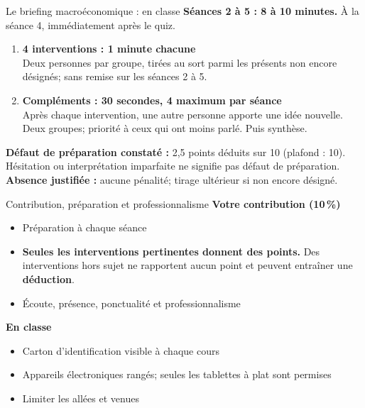 \documentclass[aspectratio=169]{beamer}
\begin{document}
\begin{frame}[t]{Le briefing macroéconomique : en classe}
   \small
   \textbf{Séances 2 à 5 : 8 à 10 minutes.} À la séance 4, immédiatement après le quiz.\par
   \vspace{0.15cm}
   \begin{enumerate}
      \setlength\itemsep{0.25cm}
      \item \textbf{4 interventions : 1 minute chacune} \\
      Deux personnes par groupe, tirées au sort parmi les présents non encore désignés; sans remise sur les séances 2 à 5.
      \item \textbf{Compléments : 30 secondes, 4 maximum par séance} \\
      Après chaque intervention, une autre personne apporte une idée nouvelle. Deux groupes; priorité à ceux qui ont moins parlé. Puis synthèse.
   \end{enumerate}
   \vspace{0.1cm}
   \begin{warning}
      \small \textbf{Défaut de préparation constaté :} 2,5 points déduits sur 10 (plafond : 10). \\
      Hésitation ou interprétation imparfaite ne signifie pas défaut de préparation. \\
      \textbf{Absence justifiée :} aucune pénalité; tirage ultérieur si non encore désigné.
   \end{warning}
\end{frame}

\begin{frame}[t]{Contribution, préparation et professionnalisme}
   \small
   \textbf{\textcolor{HECnavy}{Votre contribution (10\,\%)}}
   \begin{itemize}
      \setlength\itemsep{0.15cm}
      \item Préparation à chaque séance
      \item \textbf{Seules les interventions pertinentes donnent des points.} Des interventions hors sujet ne rapportent aucun point et peuvent entraîner une \textbf{déduction}.
      \item Écoute, présence, ponctualité et professionnalisme
   \end{itemize}
   \vspace{0.35cm}
   \textbf{\textcolor{HECnavy}{En classe}}
   \begin{itemize}
      \setlength\itemsep{0.15cm}
      \item Carton d'identification visible à chaque cours
      \item Appareils électroniques rangés; seules les tablettes à plat sont permises
      \item Limiter les allées et venues
   \end{itemize}
\end{frame}
\end{document}
